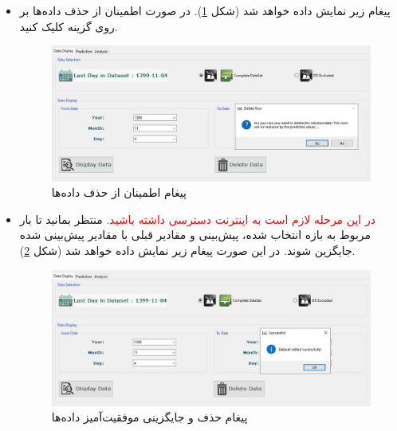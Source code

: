 \documentclass[a4paper,20pt,dvipsnames, usenames]{extbook}
\begin{document}
\begin{itemize}
\item
پیغام زیر نمایش داده خواهد شد (شکل
\ref{fig29}).
در صورت اطمینان از حذف داده‌ها بر روی گزینه
کلیک کنید.
\begin{figure}[!h]
	\centering
	\includegraphics[width = \textwidth]{fig27}
	\caption{پیغام اطمینان از حذف داده‌ها}
	\label{fig29}
\end{figure}
\item
\textcolor{red}{در این مرحله لازم است به اینترنت دسترسی داشته باشید.}
منتظر بمانید تا بار مربوط به بازه انتخاب شده، پیش‌بینی و مقادیر قبلی با مقادیر پیش‌بینی شده جایگزین شوند. در این صورت پیغام زیر نمایش داده خواهد شد (شکل
\ref{fig30}).

\begin{figure}[!h]
	\centering
	\includegraphics[width = \textwidth]{fig28}
	\caption{پیغام حذف و جایگزینی موفقیت‌‌آمیز داده‌ها}
	\label{fig30}
\end{figure}

\end{itemize}
\end{document}
